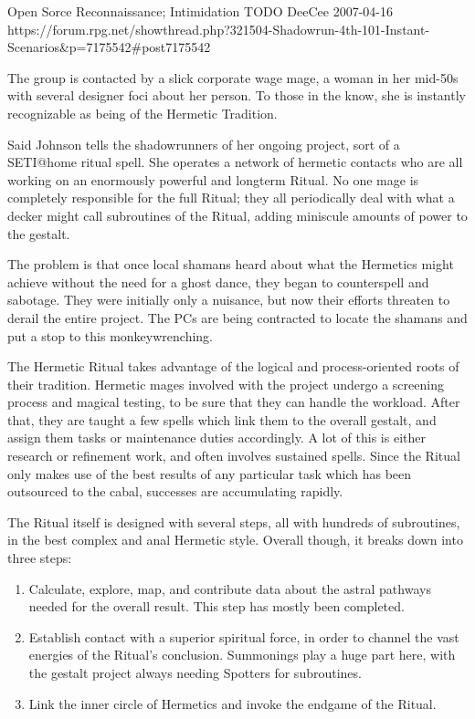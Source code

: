 \begin{scenario}{Open Sorce}
	{Reconnaissance; Intimidation}
	{TODO}
	{DeeCee}
	{2007-04-16}
	{https://forum.rpg.net/showthread.php?321504-Shadowrun-4th-101-Instant-Scenarios\&p=7175542\#post7175542}

The group is contacted by a slick corporate wage mage, a woman in her mid-50s with several designer foci about her person. To those in the know, she is instantly recognizable as being of the Hermetic Tradition.

\synopsis Said Johnson tells the shadowrunners of her ongoing project, sort of a SETI@home ritual spell. She operates a network of hermetic contacts who are all working on an enormously powerful and longterm Ritual. No one mage is completely responsible for the full Ritual; they all periodically deal with what a decker might call subroutines of the Ritual, adding miniscule amounts of power to the gestalt.

The problem is that once local shamans heard about what the Hermetics might achieve without the need for a ghost dance, they began to counterspell and sabotage. They were initially only a nuisance, but now their efforts threaten to derail the entire project. The PCs are being contracted to locate the shamans and put a stop to this monkeywrenching.

\notes The Hermetic Ritual takes advantage of the logical and process-oriented roots of their tradition. Hermetic mages involved with the project undergo a screening process and magical testing, to be sure that they can handle the workload. After that, they are taught a few spells which link them to the overall gestalt, and assign them tasks or maintenance duties accordingly. A lot of this is either research or refinement work, and often involves sustained spells. Since the Ritual only makes use of the best results of any particular task which has been outsourced to the cabal, successes are accumulating rapidly.

The Ritual itself is designed with several steps, all with hundreds of subroutines, in the best complex and anal Hermetic style. Overall though, it breaks down into three steps:

\begin{enumerate}
\item Calculate, explore, map, and contribute data about the astral pathways needed for the overall result. This step has mostly been completed.
\item Establish contact with a superior spiritual force, in order to channel the vast energies of the Ritual's conclusion. Summonings play a huge part here, with the gestalt project always needing Spotters for subroutines.
\item Link the inner circle of Hermetics and invoke the endgame of the Ritual.
\end{enumerate}


\end{scenario}
